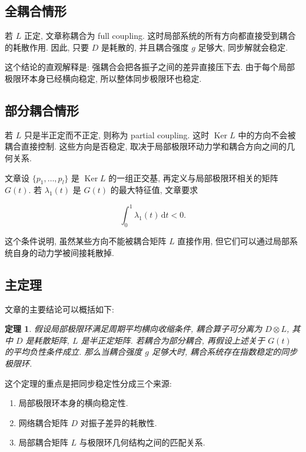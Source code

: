 \documentclass[oneside]{ctexart}
\newtheorem{theorem}{定理}[section]
\DeclareMathOperator{\Ker}{Ker}
\newcommand{\dd}{\mathrm{d}}
\begin{document}
\subsection{全耦合情形}

若 $L$ 正定, 文章称耦合为 full coupling. 这时局部系统的所有方向都直接受到耦合的耗散作用. 因此, 只要 $D$ 是耗散的, 并且耦合强度 $g$ 足够大, 同步解就会稳定.

这个结论的直观解释是: 强耦合会把各振子之间的差异直接压下去. 由于每个局部极限环本身已经横向稳定, 所以整体同步极限环也稳定.

\subsection{部分耦合情形}

若 $L$ 只是半正定而不正定, 则称为 partial coupling. 这时 $\Ker L$ 中的方向不会被耦合直接控制. 这些方向是否稳定, 取决于局部极限环动力学和耦合方向之间的几何关系.

文章设 $\{p_1,
\dots,p_l\}$ 是 $\Ker L$ 的一组正交基, 再定义与局部极限环相关的矩阵 $G(t)$. 若 $\lambda_1(t)$ 是 $G(t)$ 的最大特征值, 文章要求

\begin{equation}
    \int_0^1 \lambda_1(t)\,\dd t<0.
\end{equation}

这个条件说明, 虽然某些方向不能被耦合矩阵 $L$ 直接作用, 但它们可以通过局部系统自身的动力学被间接耗散掉.

\subsection{主定理}

文章的主要结论可以概括如下:

\begin{theorem}
    假设局部极限环满足周期平均横向收缩条件, 耦合算子可分离为 $D\otimes L$, 其中 $D$ 是耗散矩阵, $L$ 是半正定矩阵. 若耦合为部分耦合, 再假设上述关于 $G(t)$ 的平均负性条件成立. 那么当耦合强度 $g$ 足够大时, 耦合系统存在指数稳定的同步极限环.
\end{theorem}

这个定理的重点是把同步稳定性分成三个来源:

\begin{enumerate}[(1)]
    \item 局部极限环本身的横向稳定性.
    \item 网络耦合矩阵 $D$ 对振子差异的耗散性.
    \item 局部耦合矩阵 $L$ 与极限环几何结构之间的匹配关系.
\end{enumerate}
\end{document}
